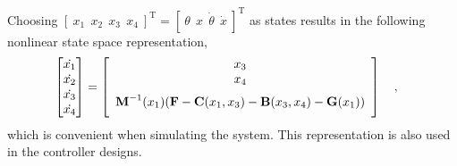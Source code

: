 Choosing $ [\ x_1\ \ x_2\ \ x_3\ \ x_4\ ]^\mathrm{T} = [\ \theta\ \ x\ \ \dot{\theta}\ \ \dot{x}\ ]^\mathrm{T} $ as states results in the following nonlinear state space representation,
%
\begin{align}
  \begin{bmatrix}
    \dot{x_1} \\
    \dot{x_2} \\
    \dot{x_3} \\
    \dot{x_4}
  \end{bmatrix}
&=
  \left[
    \begin{array}{c}
      x_3 \\
      x_4 \\
      \multirow{2}{*}{$ \vec{M}^{-1}(x_1) ( \vec{F} - \vec{C}(x_1,x_3) - \vec{B}(x_3,x_4) - \vec{G}(x_1) ) $}\\
      \phantom{eq}
    \end{array}
  \right]
  \label{eq:nonlinearStateSpace} \ \ \ ,
\end{align}
%
which is convenient when simulating the system. This representation is also used in the controller designs.


